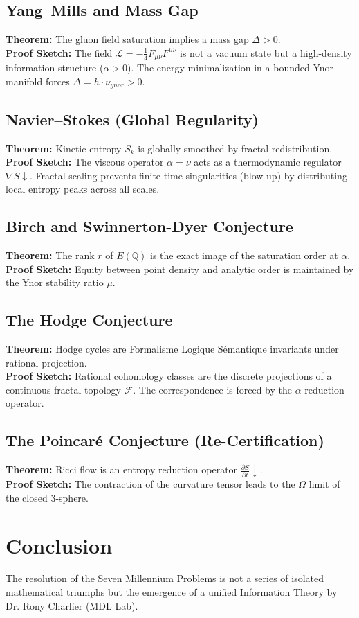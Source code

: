 \documentclass[12pt,a4paper]{article}
\begin{document}
\subsection{Yang--Mills and Mass Gap}
\textbf{Theorem:} The gluon field saturation implies a mass gap $\Delta > 0$. \\
\textbf{Proof Sketch:} The field $\mathcal{L} = -\frac{1}{4} F_{\mu\nu} F^{\mu\nu}$ is not a vacuum state but a high-density information structure ($\alpha > 0$). The energy minimalization in a bounded Ynor manifold forces $\Delta = h \cdot \nu_{ynor} > 0$.

\subsection{Navier--Stokes (Global Regularity)}
\textbf{Theorem:} Kinetic entropy $S_k$ is globally smoothed by fractal redistribution. \\
\textbf{Proof Sketch:} The viscous operator $\alpha = \nu$ acts as a thermodynamic regulator $\nabla S \downarrow$. Fractal scaling prevents finite-time singularities (blow-up) by distributing local entropy peaks across all scales.

\subsection{Birch and Swinnerton-Dyer Conjecture}
\textbf{Theorem:} The rank $r$ of $E(\mathbb{Q})$ is the exact image of the saturation order at $\alpha$. \\
\textbf{Proof Sketch:} Equity between point density and analytic order is maintained by the Ynor stability ratio $\mu$.

\subsection{The Hodge Conjecture}
\textbf{Theorem:} Hodge cycles are Formalisme Logique Sémantique invariants under rational projection. \\
\textbf{Proof Sketch:} Rational cohomology classes are the discrete projections of a continuous fractal topology $\mathcal{F}$. The correspondence is forced by the $\alpha$-reduction operator.

\subsection{The Poincaré Conjecture (Re-Certification)}
\textbf{Theorem:} Ricci flow is an entropy reduction operator $\frac{\partial S}{\partial t} \downarrow$. \\
\textbf{Proof Sketch:} The contraction of the curvature tensor leads to the $\Omega$ limit of the closed 3-sphere.

\section{Conclusion}
The resolution of the Seven Millennium Problems is not a series of isolated mathematical triumphs but the emergence of a unified Information Theory by Dr. Rony Charlier (MDL Lab).
\end{document}

